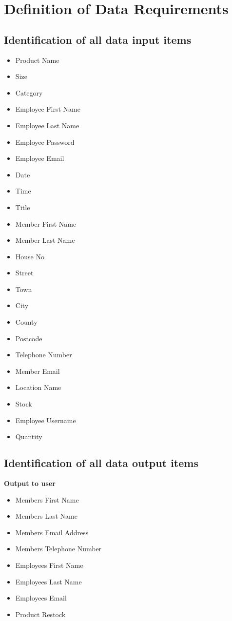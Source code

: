 \section{Definition of Data Requirements}

\subsection{Identification of all data input items}

\begin{itemize}
\item Product Name
\item Size
\item Category
\item Employee First Name
\item Employee Last Name
\item Employee Password
\item Employee Email
\item Date
\item Time
\item Title
\item Member First Name
\item Member Last Name
\item House No
\item Street
\item Town
\item City
\item County
\item Postcode
\item Telephone Number
\item Member Email
\item Location Name
\item Stock
\item Employee Username
\item Quantity
\end{itemize}

\pagebreak

\subsection{Identification of all data output items}

\textbf{Output to user}
\begin{itemize}
\item Members First Name
\item Members Last Name
\item Members Email Address
\item Members Telephone Number
\item Employees First Name
\item Employees Last Name
\item Employees Email
\item Product Restock
\end{itemize}

